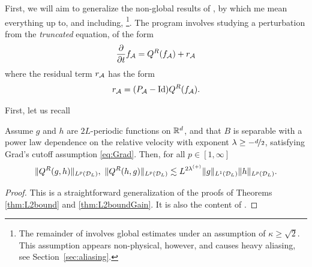 First, we will aim to generalize the non-global results of \cite{Filbet2011asm}, by
which me mean everything up to, and including,
\cite[Proposition 4.6]{Filbet2011asm}\footnote{
  The remainder of \cite{Filbet2011asm} involves global estimates under an assumption of
  $\kappa\geq\sqrt{2}$. This assumption appears non-physical, however, and causes heavy aliasing, see 
  Section~\ref{sec:aliasing}.
}. The program involves studying a perturbation from the {\em truncated} equation, of the form
\begin{equation} \label{eqn:pert}
    \frac{\partial}{\partial t}{f}_{\mathcal{A}} = Q^R(f_{\mathcal{A}}) + r_{\mathcal{A}}
\end{equation}
where the residual term $r_{\mathcal{A}}$ has the form
\[
    r_{\mathcal{A}} = (P_{\mathcal{A}}-\operatorname{Id})Q^R(f_{\mathcal{A}}).
\]

First, let us recall
\begin{lemma}\label{lem:bound}
  Assume $g$ and $h$ are $2L$-periodic functions on $\mathbb{R}^d$, and that $B$ is
  separable with a power law dependence on the relative velocity with
  exponent $\lambda \geq -\nicefrac{d}{2}$, satisfying Grad's cutoff assumption
  \eqref{eq:Grad}. Then, for all $p\in [1,\infty]$
    $$ 
        \|Q^R(g,h)\|_{L^p(\cD_L)},\ \|Q^R(h,g)\|_{L^p(\cD_L)} \lesssim 
            L^{2\ml} \|g\|_{L^1(\cD_L)}
            \|h\|_{L^p(\cD_L)}. 
    $$
\end{lemma}
\begin{proof}
This is a straightforward generalization of the proofs of Theorems
\ref{thm:L2bound} and \ref{thm:L2boundGain}. It is also the content of 
\cite[Lemma 4.1]{Filbet2011asm}.
\end{proof}

